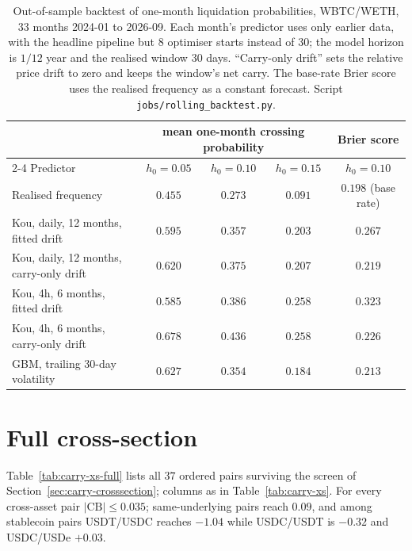 \documentclass[11pt]{article}
\theoremstyle{plain}
\theoremstyle{definition}
\theoremstyle{remark}
\begin{document}
\begin{table}[ht]
\centering\small
\begin{tabular}{lcccc}
\toprule
 & \multicolumn{3}{c}{mean one-month crossing probability} & Brier score \\
\cmidrule(lr){2-4}
Predictor & $h_0=0.05$ & $h_0=0.10$ & $h_0=0.15$ & $h_0=0.10$ \\
\midrule
Realised frequency & $0.455$ & $0.273$ & $0.091$ & $0.198$ (base rate) \\
\midrule
Kou, daily, 12 months, fitted drift & $0.595$ & $0.357$ & $0.203$ & $0.267$ \\
Kou, daily, 12 months, carry-only drift & $0.620$ & $0.375$ & $0.207$ & $0.219$ \\
Kou, 4h, 6 months, fitted drift & $0.585$ & $0.386$ & $0.258$ & $0.323$ \\
Kou, 4h, 6 months, carry-only drift & $0.678$ & $0.436$ & $0.258$ & $0.226$ \\
GBM, trailing 30-day volatility & $0.627$ & $0.354$ & $0.184$ & $0.213$ \\
\bottomrule
\end{tabular}
\caption{Out-of-sample backtest of one-month liquidation probabilities, WBTC/WETH, $33$ months
2024-01 to 2026-09. Each month's predictor uses only earlier data, with the headline pipeline but
$8$ optimiser starts instead of $30$; the model horizon is $1/12$ year and the realised window $30$ days. ``Carry-only drift'' sets the
relative price drift to zero and keeps the window's net carry. The base-rate Brier score uses the
realised frequency as a constant forecast. Script \texttt{jobs/rolling\_backtest.py}.}
\label{tab:barrier}
\end{table}

\section{Full cross-section}\label{app:cross-section}

Table~\ref{tab:carry-xs-full} lists all $37$ ordered pairs surviving the screen of
Section~\ref{sec:carry-crosssection}; columns as in Table~\ref{tab:carry-xs}. For every cross-asset
pair $|\mathrm{CB}|\le0.035$; same-underlying pairs reach $0.09$, and among stablecoin pairs USDT/USDC
reaches $-1.04$ while USDC/USDT is $-0.32$ and USDC/USDe $+0.03$.
\end{document}
